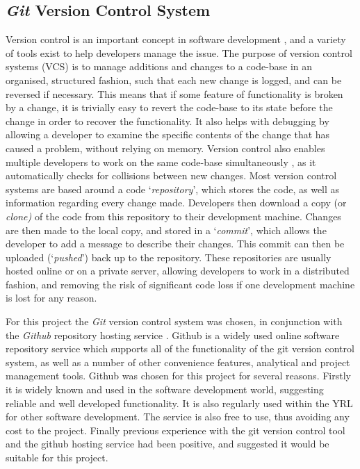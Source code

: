 \subsection{\textit{Git} Version Control System}
Version control is an important concept in software development \cite{VersionControl}, and a variety of tools exist to help developers manage the issue. The purpose of version control systems (VCS) is to manage additions and changes to a code-base in an organised, structured fashion, such that each new change is logged, and can be reversed if necessary. This means that if some feature of functionality is broken by a change, it is trivially easy to revert the code-base to its state before the change in order to recover the functionality. It also helps with debugging by allowing a developer to examine the specific contents of the change that has caused a problem, without relying on memory. Version control also enables multiple developers to work on the same code-base simultaneously \cite{SVCPatent}, as it automatically checks for collisions between new changes. Most version control systems are based around a code `\textit{repository}', which stores the code, as well as information regarding every change made. Developers then download a copy (or \textit{clone)} of the code from this repository to their development machine. Changes are then made to the local copy, and stored in a `\textit{commit}', which allows the developer to add a message to describe their changes. This commit can then be uploaded (`\textit{pushed}') back up to the repository. These repositories are usually hosted online or on a private server, allowing developers to work in a distributed fashion, and removing the risk of significant code loss if one development machine is lost for any reason.

For this project the \textit{Git} version control system \cite{ProGit} was chosen, in conjunction with the \textit{Github} repository hosting service \cite{Github}. Github is a widely used online software repository service which supports all of the functionality of the git version control system, as well as a number of other convenience features, analytical and project management tools. Github was chosen for this project for several reasons. Firstly it is widely known and used in the software development world, suggesting reliable and well developed functionality. It is also regularly used within the YRL for other software development. The service is also free to use, thus avoiding any cost to the project. Finally previous experience with the git version control tool and the github hosting service had been positive, and suggested it would be suitable for this project.

